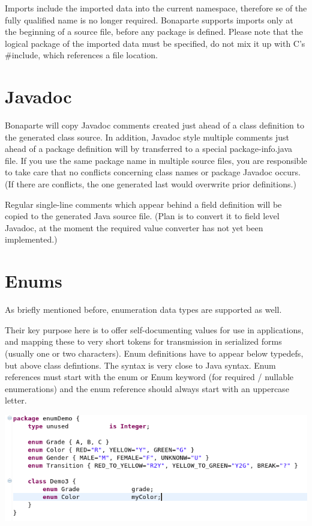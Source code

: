 \documentclass[11pt,a4paper,oneside]{article}
\begin{document}
\noindent Imports include the imported data into the current namespace, therefore se of the fully qualified name is no longer required.
Bonaparte supports imports only at the beginning of a source file, before any package is defined. Please note that the logical package of
the imported data must be specified, do not mix it up with C's {\ttfamily \#include}, which references a file location.
 
\section{Javadoc}
Bonaparte will copy Javadoc comments created just ahead of a class definition to the generated class source. In addition, Javadoc style
multiple comments just ahead of a package definition will by transferred to a special {\ttfamily package-info.java} file. 
If you use the same package name in multiple source files, you are responsible to take care that no conflicts concerning
class names or package Javadoc occurs. (If there are conflicts, the one generated last would overwrite prior definitions.) 

Regular single-line comments which appear behind a field definition will be copied to the generated Java source file.
(Plan is to convert it to field level Javadoc, at the moment the required value converter has not yet been implemented.)
 
\section{Enums}
As briefly mentioned before, enumeration data types are supported as well.

Their key purpose here is to offer self-documenting values for use in applications, and mapping these to very short tokens
for transmission in serialized forms (usually one or two characters).
Enum definitions have to appear below typedefs, but above class defintions.
The syntax is very close to Java syntax. Enum references must start with the {\ttfamily enum} or {\ttfamily Enum} keyword
 (for required / nullable enumerations) and the enum reference should always start with an uppercase letter.


\vspace{2mm}

\hspace{1cm}\includegraphics[scale=0.5]{images/tut1-013-enum.png}
\end{document}
